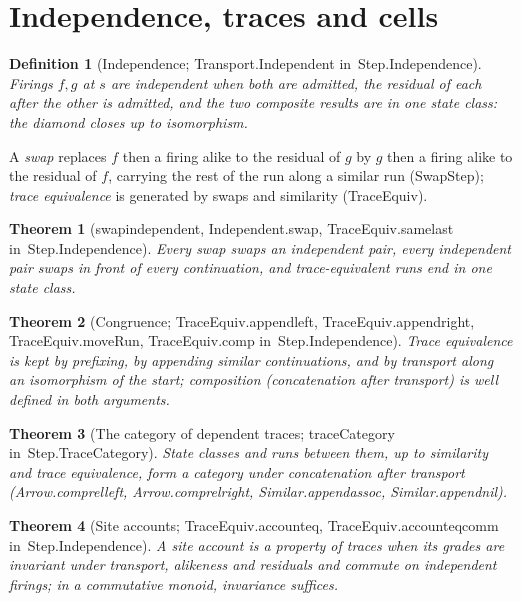 \documentclass[11pt]{article}
\newtheorem{definition}{Definition}
\newtheorem{theorem}{Theorem}
\theoremstyle{remark}
\newcommand{\lean}[1]{{\ttfamily\def\_{\textunderscore\allowbreak}#1}}
\newcommand{\inmod}[1]{in~{\ttfamily\def\_{\textunderscore\allowbreak}#1}}
\begin{document}
\section{Independence, traces and cells}

\begin{definition}[Independence; \lean{Transport.Independent} \inmod{Step.Independence}]
Firings $f,g$ at $s$ are independent when both are admitted, the residual of each after the other is
admitted, and the two composite results are in one state class: the diamond closes up to isomorphism.
\end{definition}

A \emph{swap} replaces $f$ then a firing alike to the residual of $g$ by $g$ then a firing alike to the
residual of $f$, carrying the rest of the run along a similar run (\lean{SwapStep}); \emph{trace
equivalence} is generated by swaps and similarity (\lean{TraceEquiv}).

\begin{theorem}[\lean{swap\_independent}, \lean{Independent.swap}, \lean{TraceEquiv.same\_last} \inmod{Step.Independence}]
Every swap swaps an independent pair, every independent pair swaps in front of every continuation, and
trace-equivalent runs end in one state class.
\end{theorem}

\begin{theorem}[Congruence; \lean{TraceEquiv.append\_left}, \lean{TraceEquiv.append\_right}, \lean{TraceEquiv.moveRun}, \lean{TraceEquiv.comp} \inmod{Step.Independence}]
Trace equivalence is kept by prefixing, by appending similar continuations, and by transport along an
isomorphism of the start; composition (concatenation after transport) is well defined in both arguments.
\end{theorem}

\begin{theorem}[The category of dependent traces; \lean{traceCategory} \inmod{Step.TraceCategory}]
State classes and runs between them, up to similarity and trace equivalence, form a category under
concatenation after transport (\lean{Arrow.comp\_rel\_left}, \lean{Arrow.comp\_rel\_right},
\lean{Similar.append\_assoc}, \lean{Similar.append\_nil}).
\end{theorem}

\begin{theorem}[Site accounts; \lean{TraceEquiv.account\_eq}, \lean{TraceEquiv.account\_eq\_comm} \inmod{Step.Independence}]
A site account is a property of traces when its grades are invariant under transport, alikeness and
residuals and commute on independent firings; in a commutative monoid, invariance suffices.
\end{theorem}
\end{document}
